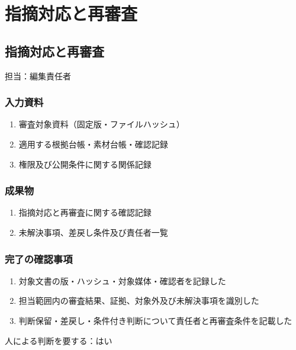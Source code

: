 \documentclass[a4paper,11pt]{article}
\begin{document}
\section{指摘対応と再審査}
\subsection{指摘対応と再審査}
\par 担当：編集責任者\par\medskip
\subsubsection*{入力資料}
\begin{enumerate}[leftmargin=2em,itemsep=0.35em]
\item 審査対象資料（固定版・ファイルハッシュ）
\item 適用する根拠台帳・素材台帳・確認記録
\item 権限及び公開条件に関する関係記録
\end{enumerate}
\subsubsection*{成果物}
\begin{enumerate}[leftmargin=2em,itemsep=0.35em]
\item 指摘対応と再審査に関する確認記録
\item 未解決事項、差戻し条件及び責任者一覧
\end{enumerate}
\subsubsection*{完了の確認事項}
\begin{enumerate}[leftmargin=2em,itemsep=0.35em]
\item 対象文書の版・ハッシュ・対象媒体・確認者を記録した
\item 担当範囲内の審査結果、証拠、対象外及び未解決事項を識別した
\item 判断保留・差戻し・条件付き判断について責任者と再審査条件を記載した
\end{enumerate}
\par 人による判断を要する：はい\par\medskip
\end{document}
